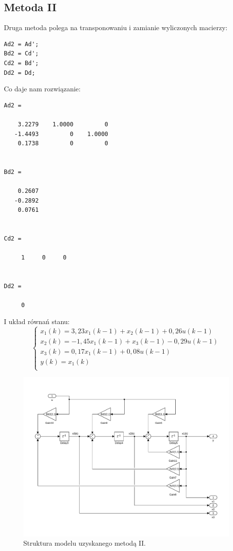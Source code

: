\subsection{Metoda II}
Druga metoda polega na transponowaniu i zamianie wyliczonych macierzy:
\begin{verbatim}
Ad2 = Ad';
Bd2 = Cd';
Cd2 = Bd';
Dd2 = Dd;
\end{verbatim}
Co daje nam rozwiązanie:
\begin{verbatim}
Ad2 =

    3.2279    1.0000         0
   -1.4493         0    1.0000
    0.1738         0         0


Bd2 =

    0.2607
   -0.2892
    0.0761


Cd2 =

     1     0     0


Dd2 =

     0
\end{verbatim}
I układ równań stanu:
\[
\left\{
\begin{array}{l}
	x_1(k)= 3,23x_1(k-1) + x_2(k-1) + 0,26u(k-1) \\
	x_2(k)= -1,45x_1(k-1) + x_3(k-1) -0,29u(k-1) \\
	x_3(k)= 0,17x_1(k-1) + 0,08u(k-1) \\
	y(k)= x_1(k) \\ 
\end{array}
\right.
\]
\begin{figure}[H]
\centering
 \includegraphics[width=\textwidth]{img/obj2.pdf}
\caption{Struktura modelu uzyskanego metodą II.}
\end{figure}



